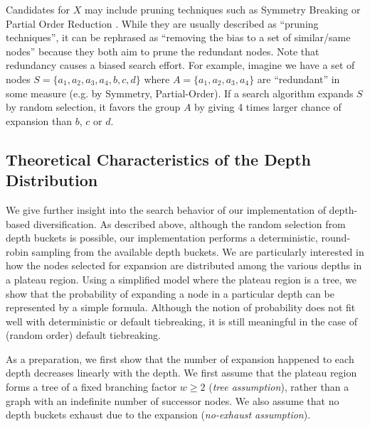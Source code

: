 Candidates for $X$ may
include pruning techniques such as Symmetry Breaking \cite{Fox1998,pochter2011exploiting,domshlak2013symmetry} or
Partial Order Reduction \cite{hall2013faster,wehrle2013relative}.
While they are usually described as ``pruning techniques'',
it can be rephrased as ``removing the bias to a set of similar/same nodes'' because
they both aim to prune the redundant nodes.
Note that redundancy causes a biased search effort. For example, imagine we have a
set of nodes $S=\{a_1, a_2, a_3, a_4, b, c, d\}$ where
$A=\{a_1, a_2, a_3, a_4\}$ are ``redundant'' in some measure (e.g. by Symmetry,
Partial-Order). 
If a search algorithm expands $S$ by random selection, it favors the
group $A$ by giving 4 times larger chance of expansion than $b$,
$c$ or $d$.

\subsection{Theoretical Characteristics of the Depth Distribution}
\label{sec:theoretical-characteristics}

We give further insight into the search behavior of our implementation
of depth-based diversification.
As described above, although the random selection from depth buckets is possible, our implementation performs a deterministic, round-robin sampling from the available depth buckets.
% 
We are particularly interested in how the nodes selected for expansion are distributed 
among the various depths in a plateau region.
Using a simplified model where the plateau region is a tree,
we show that the probability of expanding a node in a particular depth
can be represented by a simple formula.  Although the notion of
probability does not fit well with deterministic \fifo or \lifo
default tiebreaking, it is still meaningful in the case of \ro (random
order) default tiebreaking.


As a preparation, we first show that the number of expansion happened to each depth decreases
linearly with the depth.
% 
We first assume that the plateau region forms a tree of a fixed branching factor
$w\geq 2$ (\emph{tree assumption}), rather than a graph with an indefinite number of successor nodes.
We also assume that no depth buckets exhaust due to the expansion (\emph{no-exhaust assumption}).

